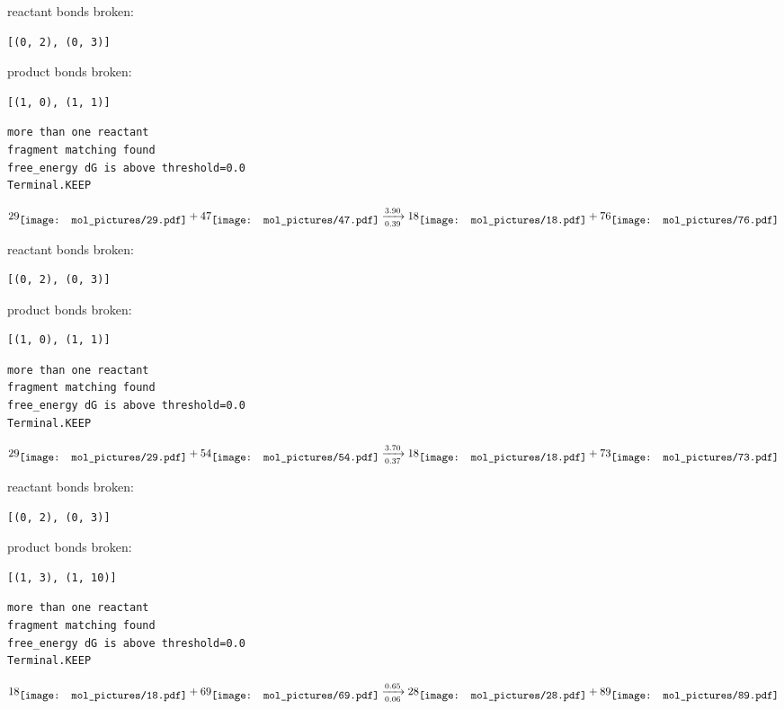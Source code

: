 \documentclass{article}
\begin{document}
reactant bonds broken:\begin{verbatim}
[(0, 2), (0, 3)]
\end{verbatim}
product bonds broken:\begin{verbatim}
[(1, 0), (1, 1)]
\end{verbatim}




\vspace{1cm}
\begin{verbatim}
more than one reactant
fragment matching found
free_energy dG is above threshold=0.0
Terminal.KEEP
\end{verbatim}
$$
29
\raisebox{-.5\height}{\texttt{[image: mol\_pictures/29.pdf]}}
+
47
\raisebox{-.5\height}{\texttt{[image: mol\_pictures/47.pdf]}}
\xrightarrow[0.39]{3.90}
18
\raisebox{-.5\height}{\texttt{[image: mol\_pictures/18.pdf]}}
+
76
\raisebox{-.5\height}{\texttt{[image: mol\_pictures/76.pdf]}}
$$


reactant bonds broken:\begin{verbatim}
[(0, 2), (0, 3)]
\end{verbatim}
product bonds broken:\begin{verbatim}
[(1, 0), (1, 1)]
\end{verbatim}




\vspace{1cm}
\begin{verbatim}
more than one reactant
fragment matching found
free_energy dG is above threshold=0.0
Terminal.KEEP
\end{verbatim}
$$
29
\raisebox{-.5\height}{\texttt{[image: mol\_pictures/29.pdf]}}
+
54
\raisebox{-.5\height}{\texttt{[image: mol\_pictures/54.pdf]}}
\xrightarrow[0.37]{3.70}
18
\raisebox{-.5\height}{\texttt{[image: mol\_pictures/18.pdf]}}
+
73
\raisebox{-.5\height}{\texttt{[image: mol\_pictures/73.pdf]}}
$$


reactant bonds broken:\begin{verbatim}
[(0, 2), (0, 3)]
\end{verbatim}
product bonds broken:\begin{verbatim}
[(1, 3), (1, 10)]
\end{verbatim}




\vspace{1cm}
\begin{verbatim}
more than one reactant
fragment matching found
free_energy dG is above threshold=0.0
Terminal.KEEP
\end{verbatim}
$$
18
\raisebox{-.5\height}{\texttt{[image: mol\_pictures/18.pdf]}}
+
69
\raisebox{-.5\height}{\texttt{[image: mol\_pictures/69.pdf]}}
\xrightarrow[0.06]{0.65}
28
\raisebox{-.5\height}{\texttt{[image: mol\_pictures/28.pdf]}}
+
89
\raisebox{-.5\height}{\texttt{[image: mol\_pictures/89.pdf]}}
$$
\end{document}

